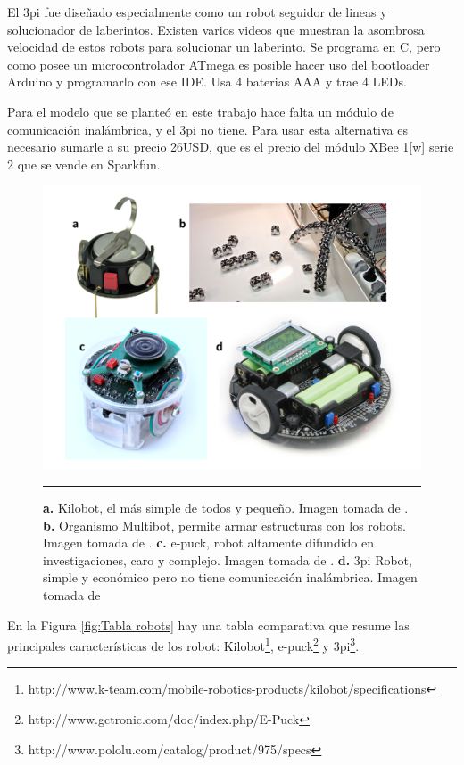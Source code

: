 El 3pi fue diseñado especialmente como un robot seguidor de lineas y solucionador de laberintos. Existen varios videos que muestran la asombrosa velocidad de estos robots para solucionar un laberinto. Se programa en C, pero como posee un microcontrolador ATmega es posible hacer uso del bootloader Arduino y programarlo con ese IDE. Usa 4 baterias AAA y trae 4 LEDs.

Para el modelo que se planteó en este trabajo hace falta un módulo de comunicación inalámbrica, y el 3pi no tiene. Para usar esta alternativa es necesario sumarle a su precio 26USD, que es el precio del módulo XBee 1[w] serie 2 que se vende en Sparkfun.

\begin{figure}[htbp]
	\centering
		\includegraphics[width=\textwidth]{./Figures/robots.png}
		\rule{35em}{0.5pt} 
	\caption[Robots estudiados como alternativa para armar un enjambre de robots.]{\textbf{a.} Kilobot, el más simple de todos y pequeño. Imagen tomada de \cite{6224638}. \textbf{b.} Organismo Multibot, permite armar estructuras con los robots. Imagen tomada de \cite{5359578}. \textbf{c.} e-puck, robot altamente difundido en investigaciones, caro y complejo. Imagen tomada de \cite{mondada2009puck}. \textbf{d.} 3pi Robot, simple y económico pero no tiene comunicación inalámbrica. Imagen tomada de \cite{thurskyusing}}
	\label{fig:3pi}
\end{figure}

En la Figura \ref{fig:Tabla robots} hay una tabla comparativa que resume las principales características de los robot: Kilobot\footnote{http://www.k-team.com/mobile-robotics-products/kilobot/specifications}, e-puck\footnote{http://www.gctronic.com/doc/index.php/E-Puck} y 3pi\footnote{http://www.pololu.com/catalog/product/975/specs}.

